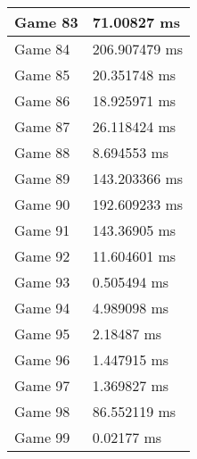 \begin{tabular}{|l|l|}
	Game 83 & 71.00827 ms \\ \hline
	Game 84 & 206.907479 ms \\ \hline
	Game 85 & 20.351748 ms \\ \hline
	Game 86 & 18.925971 ms \\ \hline
	Game 87 & 26.118424 ms \\ \hline
	Game 88 & 8.694553 ms \\ \hline
	Game 89 & 143.203366 ms \\ \hline
	Game 90 & 192.609233 ms \\ \hline
	Game 91 & 143.36905 ms \\ \hline
	Game 92 & 11.604601 ms \\ \hline
	Game 93 & 0.505494 ms \\ \hline
	Game 94 & 4.989098 ms \\ \hline
	Game 95 & 2.18487 ms \\ \hline
	Game 96 & 1.447915 ms \\ \hline
	Game 97 & 1.369827 ms \\ \hline
	Game 98 & 86.552119 ms \\ \hline
	Game 99 & 0.02177 ms \\ \hline
\end{tabular}
